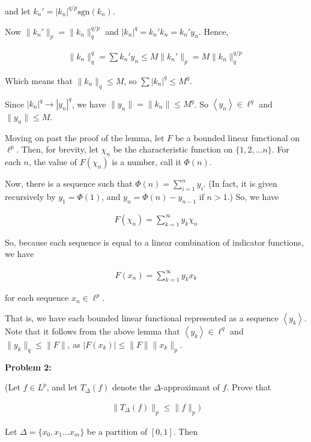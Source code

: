 \documentclass[a4paper,12pt]{article}
\newcommand{\tab}{\hspace{4mm}} %
\newcommand{\shunt}{\vspace{20mm}}
\newcommand{\absval}[1]{\left\lvert #1 \right\rvert}
\newcommand{\norm}[1]{\|#1\|}
\newcommand{\anbrack}[1]{\left\langle #1 \right\rangle}
\newcommand{\De}{\Delta}
\begin{document}
\tab and let $k_n' = \absval{k_n}^{q/p} \text{sgn}(k_n)$.

\tab Now $\norm{k_n'}_p = \norm{k_n}_q^{q/p}$ and $\absval{k_n}^q = k_n'k_n=k_n'y_n$. Hence,

\begin{align*}
\norm{k_n}_q^q = \sum k_n'y_n \leq M\norm{k_n'}_p = M\norm{k_n}_q^{q/p}
\end{align*}

Which means that $\norm{k_n}_q \leq M$, so $\sum \absval{k_n}^q \leq M^q$.

Since $\absval{k_n}^q \to \absval{y_n}^q$, we have $\norm{y_n} = \norm{k_n} \leq M^q$. So $\anbrack{y_n} \in \ell^q$ and $\norm{y_n} \leq M$. %

Moving on past the proof of the lemma, let $F$ be a bounded linear functional on $\ell^p$. Then, for brevity, let $\chi_n$ be the characteristic function on $\{1,2, \ldots n\}$. For each $n$, the value of $F(\chi_n)$ is a number, call it $\Phi(n)$.

Now, there is a sequence such that $\Phi(n) = \sum\limits_{i=1}^n y_i$. (In fact, it is given recursively by $y_1 = \Phi(1)$, and $y_n = \Phi(n)-y_{n-1}$ if $n >1$.) So, we have

\begin{align*}
F(\chi_n) = \sum\limits_{k=1}^\infty y_k \chi_n
\end{align*}

So, because each sequence is equal to a linear combination of indicator functions, we have

\begin{align*}
F(x_n) = \sum\limits_{k=1}^\infty y_k x_k
\end{align*}

for each sequence $x_n \in \ell^p$. 

That is, we have each bounded linear functional represented as a sequence $\anbrack{y_k}$. Note that it follows from the above lemma that $\anbrack{y_k} \in \ell^q$ and $\norm{y_k}_q \leq \norm{F}$, as $\absval{F(x_k)} \leq \norm{F}\norm{x_k}_p$. 

\shunt

{\bf Problem 2:} 

(Let $f \in L^p$, and let $T_\De(f)$ denote the $\De$-approximant of $f$. Prove that

\begin{align*}
\norm{T_\De(f)}_p \leq \norm{f}_p)
\end{align*}

Let $\De = \{x_0,x_1 \ldots x_m\}$ be a partition of $[0,1]$. Then 
\end{document}
